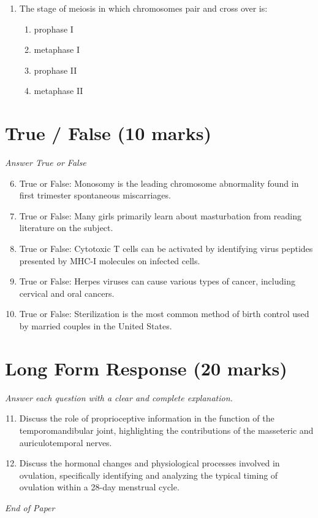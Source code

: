 \documentclass[12pt]{article}
\begin{document}
\begin{enumerate}[label=\arabic*.]
\begin{enumerate}[label=(\alph*)]
    \item Microsatellites
    \item Minisatellites
    \item Satellites
\end{enumerate}
\item The stage of meiosis in which chromosomes pair and cross over is:
\begin{enumerate}[label=(\alph*)]
    \item prophase I
    \item metaphase I
    \item prophase II
    \item metaphase II
\end{enumerate}
\end{enumerate}

\section*{True / False (10 marks)}
\textit{Answer True or False}
\begin{enumerate}[label=\arabic*.]
\setcounter{enumi}{5}
\item True or False: Monosomy is the leading chromosome abnormality found in first trimester spontaneous miscarriages.
\item True or False: Many girls primarily learn about masturbation from reading literature on the subject.
\item True or False: Cytotoxic T cells can be activated by identifying virus peptides presented by MHC-I molecules on infected cells.
\item True or False: Herpes viruses can cause various types of cancer, including cervical and oral cancers.
\item True or False: Sterilization is the most common method of birth control used by married couples in the United States.
\end{enumerate}

\section*{Long Form Response (20 marks)}
\textit{Answer each question with a clear and complete explanation.}
\begin{enumerate}[label=\arabic*.]
\setcounter{enumi}{10}
\item Discuss the role of proprioceptive information in the function of the temporomandibular joint, highlighting the contributions of the masseteric and auriculotemporal nerves.
\item Discuss the hormonal changes and physiological processes involved in ovulation, specifically identifying and analyzing the typical timing of ovulation within a 28-day menstrual cycle.
\end{enumerate}

\vfill
\noindent\textit{End of Paper}
\end{document}
